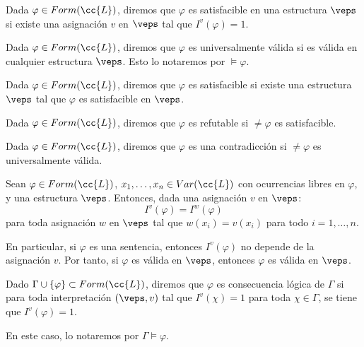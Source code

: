 \begin{definicion}
    Dada $\varphi\in Form(\cc{L})$, diremos que $\varphi$ es satisfacible en una estructura $\veps$ si existe una asignación $v$ en $\veps$ tal que $I^v(\varphi)=1$.
\end{definicion}

\begin{definicion}
    Dada $\varphi\in Form(\cc{L})$, diremos que $\varphi$ es universalmente válida si es válida en cualquier estructura $\veps$. Esto lo notaremos por $\vDash \varphi$.
\end{definicion}

\begin{definicion}
    Dada $\varphi\in Form(\cc{L})$, diremos que $\varphi$ es satisfacible si existe una estructura $\veps$ tal que $\varphi$ es satisfacible en $\veps$.
\end{definicion}

\begin{definicion}
    Dada $\varphi\in Form(\cc{L})$, diremos que $\varphi$ es refutable si $\neq \varphi$ es satisfacible.
\end{definicion}

\begin{definicion}
    Dada $\varphi\in Form(\cc{L})$, diremos que $\varphi$ es una contradicción si $\neq \varphi$ es universalmente válida.
\end{definicion}

\begin{lema}[de Coincidencia]
    Sean $\varphi\in Form(\cc{L})$, $x_1,\ldots,x_n\in Var(\cc{L})$ con ocurrencias libres en $\varphi$, y una estructura $\veps$. Entonces, dada una asignación $v$ en $\veps$:
    \begin{equation*}
        I^v(\varphi) = I^{w}(\varphi)
    \end{equation*}
    para toda asignación $w$ en $\veps$ tal que $w(x_i)=v(x_i)$ para todo $i=1,\ldots,n$.
\end{lema}

En particular, si $\varphi$ es una sentencia, entonces $I^v(\varphi)$ no depende de la asignación $v$. Por tanto, si $\varphi$ es válida en $\veps$, entonces $\varphi$ es válida en $\veps$.

\begin{definicion}
    Dado $\Gamma \cup \{\varphi\}\subset Form(\cc{L})$, diremos que $\varphi$ es consecuencia lógica de $\Gamma$ si para toda interpretación $(\veps,v)$ tal que $I^v(\chi)=1$ para toda $\chi\in\Gamma$, se tiene que $I^v(\varphi)=1$.

    En este caso, lo notaremos por $\Gamma\vDash\varphi$.
\end{definicion}

